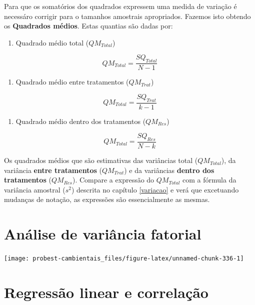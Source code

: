 \documentclass[
]{book}
\providecommand{\tightlist}{%
  \setlength{\itemsep}{0pt}\setlength{\parskip}{0pt}}
\begin{document}
Para que os somatórios dos quadrados expressem uma medida de variação é necessáro corrigir para o tamanhos amostrais apropriados. Fazemos isto obtendo os \textbf{Quadrados médios}. Estas quantias são dadas por:

\begin{enumerate}
\def\labelenumi{\arabic{enumi}.}
\tightlist
\item
  Quadrado médio total (\(QM_{Total}\))
\end{enumerate}

\[QM_{Total} = \frac{SQ_{Total}}{N -1}\]

\begin{enumerate}
\def\labelenumi{\arabic{enumi}.}
\setcounter{enumi}{1}
\tightlist
\item
  Quadrado médio entre tratamentos (\(QM_{Trat}\))
\end{enumerate}

\[QM_{Total} = \frac{SQ_{Trat}}{k - 1}\]

\begin{enumerate}
\def\labelenumi{\arabic{enumi}.}
\setcounter{enumi}{2}
\tightlist
\item
  Quadrado médio dentro dos tratamentos (\(QM_{Res}\))
\end{enumerate}

\[QM_{Total} = \frac{SQ_{Res}}{N-k}\]

Os quadrados médios que são estimativas das variâncias total (\(QM_{Total}\)), da variância \textbf{entre tratamentos} (\(QM_{Trat}\)) e da variâncias \textbf{dentro dos tratamentos} (\(QM_{Res}\)). Compare a expressão do \(QM_{Total}\) com a fórmula da variância amostral (\(s^2\)) descrita no capítulo \ref{variacao} e verá que excetuando mudanças de notação, as expressões são essencialmente as mesmas.

\hypertarget{anovafatorial}{%
\chapter{Análise de variância fatorial}\label{anovafatorial}}

\begin{center}\texttt{[image: probest-cambientais\_files/figure-latex/unnamed-chunk-336-1]} \end{center}

\hypertarget{regressao}{%
\chapter{Regressão linear e correlação}\label{regressao}}
\end{document}
